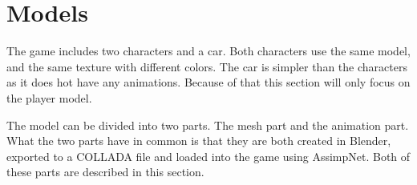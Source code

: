 \section{Models} \label{sec:theory_theory_models}
The game includes two characters and a car. 
Both characters use the same model, and the same texture with different colors.
The car is simpler than the characters as it does hot have any animations.
Because of that this section will only focus on the player model.

The model can be divided into two parts.
The mesh part and the animation part.
What the two parts have in common is that they are both created in Blender, exported to a COLLADA file and loaded into the game using AssimpNet.
Both of these parts are described in this section.



